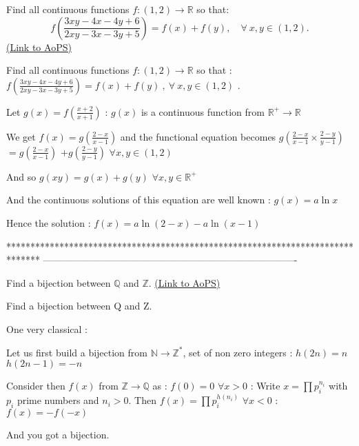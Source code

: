 \begin{problem}
	Find all continuous functions $f:(1,2)\to\mathbb R$ so that: \[f\left(\frac {3xy-4x-4y+6}{2xy-3x-3y+5}\right)=f(x)+f(y),\quad\forall\ x,y\in (1,2).\]
	\flushright \href{https://artofproblemsolving.com/community/c6h389227}{(Link to AoPS)}
\end{problem}



\begin{solution}
	\begin{tcolorbox}Find all continuous functions $f:(1,2)\to\mathbb R$ so that : $f\left(\frac {3xy-4x-4y+6}{2xy-3x-3y+5}\right)=f(x)+f(y)\ ,\ \forall\ x,y\in (1,2)$ .\end{tcolorbox}
Let $g(x)=f(\frac{x+2}{x+1})$ : $g(x)$ is a continuous function from $\mathbb R^+\to\mathbb R$

We get $f(x)=g(\frac{2-x}{x-1})$ and the functional equation becomes $g(\frac{2-x}{x-1}\times\frac{2-y}{y-1})$ $=g(\frac{2-x}{x-1})$ $+g(\frac{2-y}{y-1})$ $\forall x,y\in(1,2)$

And so $g(xy)=g(x)+g(y)$ $\forall x,y\in\mathbb R^+$

And the continuous solutions of this equation are well known : $g(x)=a\ln x$

Hence the solution : $\boxed{f(x)=a\ln(2-x)-a\ln(x-1)}$
\end{solution}
*******************************************************************************
-------------------------------------------------------------------------------

\begin{problem}
	Find a bijection between $\mathbb Q$ and $\mathbb Z$.
	\flushright \href{https://artofproblemsolving.com/community/c6h389308}{(Link to AoPS)}
\end{problem}



\begin{solution}
	\begin{tcolorbox}Find a bijection between Q and Z.\end{tcolorbox}
One very classical :

Let us first build a bijection from $\mathbb N\to\mathbb Z^*$, set of non zero integers :
$h(2n)=n$
$h(2n-1)=-n$

Consider then $f(x)$ from $\mathbb Z\to\mathbb Q$ as :
$f(0)=0$
$\forall x>0$ : Write $x=\prod p_i^{n_i}$ with $p_i$ prime numbers and $n_i>0$. Then $f(x)=\prod p_i^{h(n_i)}$
$\forall x<0$ : $f(x)=-f(-x)$

And you got a bijection.
\end{solution}



